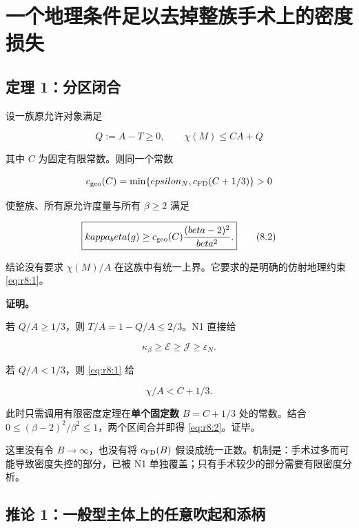 \documentclass[UTF8,11pt,openany,oneside,fontset=none]{ctexbook}
\begin{document}
\section{一个地理条件足以去掉整族手术上的密度损失}\label{ch8:ux4e00ux4e2aux5730ux7406ux6761ux4ef6ux8db3ux4ee5ux53bbux6389ux6574ux65cfux624bux672fux4e0aux7684ux5bc6ux5ea6ux635fux5931}

\subsection{定理 1：分区闭合}\label{ch8:ux5b9aux7406-1ux5206ux533aux95edux5408}

设一族原允许对象满足

\[
Q:=A-T\ge0,\qquad \chi(M)\le C A+Q
\tag{8.1}\label{eq:r8:1}
\]

其中 \(C\) 为固定有限常数。则同一个常数

\[
c_{\rm geo}(C)=\min\{\varepsilon_N,c_{\rm FD}(C+1/3)\}>0
\]

使整族、所有原允许度量与所有 \(\beta\ge2\) 满足

\[
\boxed{\kappa_\beta(g)\ge
c_{\rm geo}(C)\frac{(\beta-2)^2}{\beta^2}.}
\tag{8.2}\label{eq:r8:2}
\]

结论没有要求 \(\chi(M)/A\) 在这族中有统一上界。它要求的是明确的仿射地理约束 \eqref{eq:r8:1}。

\textbf{证明。}

若 \(Q/A\ge1/3\)，则 \(T/A=1-Q/A\le2/3\)。N1 直接给

\[
\kappa_\beta\ge\mathcal E\ge\mathcal J\ge\varepsilon_N.
\]

若 \(Q/A<1/3\)，则 \eqref{eq:r8:1} 给

\[
\chi/A<C+1/3.
\]

此时只需调用有限密度定理在\textbf{单个固定数} \(B=C+1/3\) 处的常数。结合 \(0\le(\beta-2)^2/\beta^2\le1\)，两个区间合并即得 \eqref{eq:r8:2}。证毕。

这里没有令 \(B\to\infty\)，也没有将 \(c_{\rm FD}(B)\) 假设成统一正数。机制是：手术过多而可能导致密度失控的部分，已被 N1 单独覆盖；只有手术较少的部分需要有限密度分析。

\subsection{推论 1：一般型主体上的任意吹起和添柄}\label{ch8:ux63a8ux8bba-1ux4e00ux822cux578bux4e3bux4f53ux4e0aux7684ux4efbux610fux5439ux8d77ux548cux6dfbux67c4}

\cite{LeBrunRicci,Noether}
\end{document}
